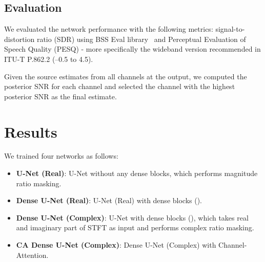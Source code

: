 \documentclass{article}
\begin{document}
\subsection{Evaluation}



We evaluated the network performance with the following metrics: signal-to-distortion ratio (SDR) using BSS Eval library~\cite{bsseval} and Perceptual Evaluation of Speech Quality (PESQ) - more specifically the wideband version recommended in ITU-T P.862.2 (–0.5 to 4.5).

Given the source estimates  from all  channels at the output, we computed the posterior SNR for each channel and selected the channel with the highest posterior SNR as the final estimate.

\vspace{-0.5em}
\section{Results}
\label{sec:res}
\vspace{-0.5em}
We trained four networks as follows:

\begin{itemize}
	\vspace{-0.5em}
\item \textbf{U-Net (Real)}: U-Net without any dense blocks, which performs magnitude ratio masking.
\item \textbf{Dense U-Net (Real)}: U-Net (Real) with dense blocks ().
\item \textbf{Dense U-Net (Complex)}: U-Net with dense blocks (), which takes real and imaginary part of STFT as input and performs complex ratio masking.
\item \textbf{CA Dense U-Net (Complex)}: Dense U-Net (Complex) with Channel-Attention.
\end{itemize}
\end{document}
